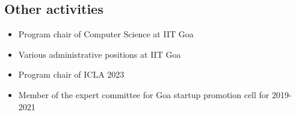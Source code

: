 \documentclass[margin]{res}
\begin{document}
\begin{resume}
\section{Other activities}
\begin{itemize}
 \item Program chair of Computer Science at IIT Goa
 \item Various administrative positions at IIT Goa
 \item Program chair of ICLA 2023
 \item Member of the expert committee for Goa startup promotion cell for 2019-2021
\end{itemize}




\end{resume}
\end{document}
